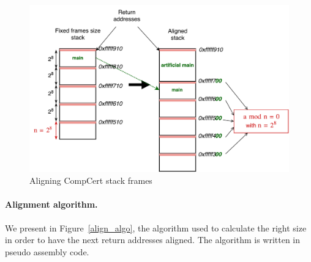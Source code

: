 \documentclass[11pt]{sdm}
\begin{document}
\begin{figure}[!ht]
\centering
\includegraphics[scale=0.6]{images/stack_align.pdf}
\caption{Aligning CompCert stack frames}
\label{stack_align}
\end{figure}

\paragraph{Alignment algorithm.}
\label{par:Alignment algorithm}
We present in Figure~\ref{align_algo}, the algorithm used to calculate the right size in order to have the next return addresses aligned. The algorithm is written in pseudo assembly code.
\end{document}
